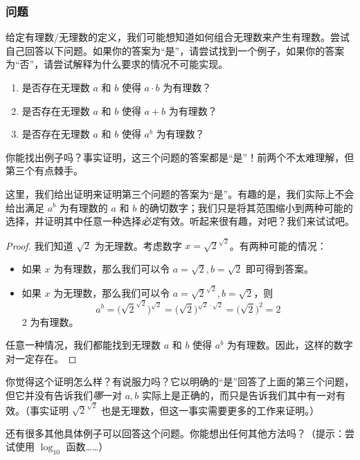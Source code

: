 \subsubsection*{问题}

给定有理数/无理数的定义，我们可能想知道如何组合无理数来产生有理数。尝试自己回答以下问题。如果你的答案为``是''，请尝试找到一个例子，如果你的答案为``否''，请尝试解释为什么要求的情况不可能实现。

\begin{enumerate}
    \item 是否存在无理数 $a$ 和 $b$ 使得 $a \cdot b$ 为有理数？
    \item 是否存在无理数 $a$ 和 $b$ 使得 $a + b$ 为有理数？
    \item 是否存在无理数 $a$ 和 $b$ 使得 $a^b$ 为有理数？
\end{enumerate}

你能找出例子吗？事实证明，这三个问题的答案都是``是''！前两个不太难理解，但第三个有点棘手。

这里，我们给出证明来证明第三个问题的答案为``是''。有趣的是，我们实际上不会给出满足 $a^b$ 为有理数的 $a$ 和 $b$ 的确切数字；我们只是将其范围缩小到两种可能的选择，并证明其中任意一种选择\emph{必定}有效。听起来很有趣，对吧？我们来试试吧。

\begin{proof}
    我们知道 $\sqrt{2}$ 为无理数。考虑数字 $x = \sqrt{2}^{\sqrt{2}}$。有两种可能的情况：
    \begin{itemize}
        \item 如果 $x$ 为有理数，那么我们可以令 $a = \sqrt{2}, b = \sqrt{2}$ 即可得到答案。
        \item 如果 $x$ 为无理数，那么我们可以令 $a = \sqrt{2}^{\sqrt{2}}, b = \sqrt{2}$，则
        \[a^b = \Bigg(\sqrt{2}^{\sqrt{2}}\Bigg)^{\sqrt{2}} = \Big(\sqrt{2}\Big)^{\sqrt{2} \cdot \sqrt{2}} = \Big(\sqrt{2}\Big)^2 = 2\]
        $2$ 为有理数。
    \end{itemize}
    任意一种情况，我们都能找到无理数 $a$ 和 $b$ 使得 $a^b$ 为有理数。因此，这样的数字对一定存在。
\end{proof}

你觉得这个证明怎么样？有说服力吗？它以明确的``是''回答了上面的第三个问题，但它并没有告诉我们\emph{哪}一对 $a, b$ 实际上是正确的，而只是告诉我们其中有一对有效。（事实证明 $\sqrt{2}^{\sqrt{2}}$ 也是无理数，但这一事实需要更多的工作来证明。）

还有很多其他具体例子可以回答这个问题。你能想出任何其他方法吗？（提示：尝试使用 $\log_{10}$ 函数……）
